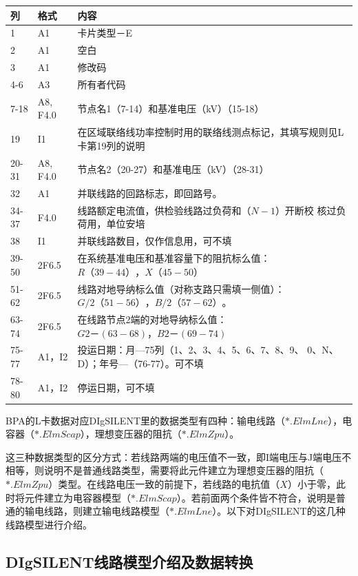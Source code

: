 \begin{spacing}{1.0}
\begin{longtable}[h]{llp{}}
\toprule
列 & 格式 & 内容\\
 \midrule
1 & A1 & 卡片类型－E\\
2 & A1 & 空白\\ 
3 & A1 & 修改码 \\
4-6 & A3 & 所有者代码 \\
7-18 & A8, F4.0 & 节点名1（7-14）和基准电压（kV）（15-18） \\
19 & I1 & 在区域联络线功率控制时用的联络线测点标记，其填写规则见L卡第19列的说明\\ 
20-31  & A8, F4.0  &节点名2（20-27）和基准电压（kV）（28-31） \\
32 & A1 & 并联线路的回路标志，即回路号。 \\
34-37 &	F4.0 & 线路额定电流值，供检验线路过负荷和（$N-1$）开断校
核过负荷用，单位安培 \\
38 & I1 & 并联线路数目，仅作信息用，可不填 \\
39-50&	 2F6.5 & 在系统基准电压和基准容量下的阻抗标么值：$R（39-
44），X（45-50）$ \\
51-62	& 2F6.5 & 线路对地导纳标么值（对称支路只需填一侧值）：$G/2
（51-56），B/2（57-62）$。\\
63-74	& 2F6.5 & 在线路节点2端的对地导纳标么值：$G2－(63-68)，B2－
(69-74) $ \\
75-77 	&A1，I2 & 投运日期：月—75列（1、2、3、4、5、6、7、8、9、
0、N、D）；年号—（76-77）。可不填 \\
78-80	&A1，I2 & 停运日期，可不填\\
\bottomrule
\end{longtable}
\end{spacing}

BPA的L卡数据对应DIgSILENT里的数据类型有四种：输电线路（$*.ElmLne$），电容器（$*.ElmScap$），理想变压器的阻抗（$*.ElmZpu$）。

这三种数据类型的区分方式：若线路两端的电压值不一致，即I端电压与J端电压不相等，则说明不是普通线路类型，需要将此元件建立为理想变压器的阻抗（$*.ElmZpu$）类型。在线路电压一致的前提下，若线路的电抗值（$X$）小于零，此时将元件建立为电容器模型（$*.ElmScap$）。若前面两个条件皆不符合，说明是普通的输电线路，则建立输电线路模型（$*.ElmLne$）。以下对DIgSILENT的这几种线路模型进行介绍。

\subsection{DIgSILENT线路模型介绍及数据转换}


